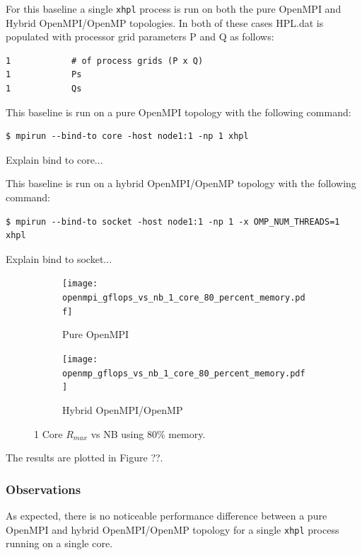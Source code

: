 \documentclass{report}
\begin{document}
For this baseline a single \verb|xhpl| process is run on both the pure OpenMPI and Hybrid OpenMPI/OpenMP topologies. In both of these cases HPL.dat is populated with processor grid parameters P and Q as follows:

\lstset{style=listing}
\begin{lstlisting}[numbers=none]
1            # of process grids (P x Q)
1            Ps
1            Qs
\end{lstlisting}

This baseline is run on a pure OpenMPI topology with the following command:

\lstset{style=type}
\begin{lstlisting}[]
$ mpirun --bind-to core -host node1:1 -np 1 xhpl
\end{lstlisting}

Explain bind to core...

This baseline is run on a hybrid OpenMPI/OpenMP topology with the following command:

\lstset{style=type}
\begin{lstlisting}[]
$ mpirun --bind-to socket -host node1:1 -np 1 -x OMP_NUM_THREADS=1 xhpl
\end{lstlisting}

Explain bind to socket...

\begin{figure}
	\begin{subfigure}{1.0\textwidth}
		\centering
		\texttt{[image: openmpi\_gflops\_vs\_nb\_1\_core\_80\_percent\_memory.pdf]}
		\caption{Pure OpenMPI}
		\label{fig:subim1}
	\end{subfigure}
	\par\bigskip
	\begin{subfigure}{1.0\textwidth}
		\centering
		\texttt{[image: openmp\_gflops\_vs\_nb\_1\_core\_80\_percent\_memory.pdf]}
		\caption{Hybrid OpenMPI/OpenMP}
		\label{fig:subim2}
	\end{subfigure}
\caption{1 Core $R_{max}$ vs NB using 80\% memory.}
\label{fig:image2}
\end{figure}

The results are plotted in Figure ??.


%
%
\subsubsection{Observations}

As expected, there is no noticeable performance difference between a pure OpenMPI and hybrid OpenMPI/OpenMP topology for a single \verb|xhpl| process running on a single core.
\end{document}
